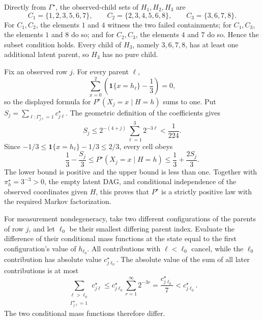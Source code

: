 Directly from \(\Gamma^{\star}\), the observed-child sets of \(H_1,H_2,H_3\) are
\[
 C_1=\{1,2,3,5,6,7\},\qquad
 C_2=\{2,3,4,5,6,8\},\qquad
 C_3=\{3,6,7,8\}.
\]
For \(C_1,C_2\), the elements \(1\) and \(4\) witness the two failed containments; for \(C_1,C_3\), the elements \(1\) and \(8\) do so; and for \(C_2,C_3\), the elements \(4\) and \(7\) do so.  Hence the subset condition holds.  Every child of \(H_3\), namely \(3,6,7,8\), has at least one additional latent parent, so \(H_3\) has no pure child.

Fix an observed row \(j\).  For every parent \(\ell\),
\[
 \sum_{x=0}^2\left(\mathbf 1\{x=h_\ell\}-\frac13\right)=0,
\]
so the displayed formula for \(P^{\star}(X_j=x\mid H=h)\) sums to one.  Put
\(S_j=\sum_{\ell:\Gamma^{\star}_{j\ell}=1}c^{\star}_{j\ell}\).  The geometric definition of the coefficients gives
\[
 S_j\le 2^{-(4+j)}\sum_{\ell=1}^3 2^{-3\ell}<\frac1{224}.
\]
Since \(-1/3\le \mathbf 1\{x=h_\ell\}-1/3\le2/3\), every cell obeys
\[
 \frac13-\frac{S_j}{3}
 \le P^{\star}(X_j=x\mid H=h)
 \le\frac13+\frac{2S_j}{3}.
\]
The lower bound is positive and the upper bound is less than one.  Together with \(\pi_h^{\star}=3^{-3}>0\), the empty latent DAG, and conditional independence of the observed coordinates given \(H\), this proves that \(P^{\star}\) is a strictly positive law with the required Markov factorization.

For measurement nondegeneracy, take two different configurations of the parents of row \(j\), and let \(\ell_0\) be their smallest differing parent index.  Evaluate the difference of their conditional mass functions at the state equal to the first configuration's value of \(h_{\ell_0}\).  All contributions with \(\ell<\ell_0\) cancel, while the \(\ell_0\) contribution has absolute value \(c^{\star}_{j\ell_0}\).  The absolute value of the sum of all later contributions is at most
\[
 \sum_{\substack{\ell>\ell_0\\\Gamma^{\star}_{j\ell}=1}}c^{\star}_{j\ell}
 \le c^{\star}_{j\ell_0}\sum_{r=1}^{\infty}2^{-3r}
 =\frac{c^{\star}_{j\ell_0}}7
 <c^{\star}_{j\ell_0}.
\]
The two conditional mass functions therefore differ.

